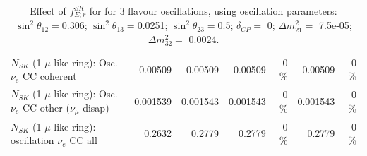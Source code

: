\begin{table}
\begin{tabular}{| l | r | r | r  r | r  r |}
                          $N_{SK}$ (1 $\mu$-like ring): Osc. $\nu_e$ CC coherent &         0.00509 &         0.00509 &         0.00509 &        0 \%  &         0.00509 &        0 \%  \\ 
           $N_{SK}$ (1 $\mu$-like ring): Osc. $\nu_e$ CC other ($\nu_\mu$ disap) &        0.001539 &        0.001543 &        0.001543 &        0 \%  &        0.001543 &        0 \%  \\ 
                        $N_{SK}$ (1 $\mu$-like ring): oscillation $\nu_e$ CC all &          0.2632 &          0.2779 &          0.2779 &        0 \%  &          0.2779 &        0 \%  \\ 
\hline
\hline
\end{tabular}
\caption{ Effect of $f_{E; r}^{SK}$   for for 3 flavour oscillations, using oscillation parameters:  $\sin^2\theta_{12} = $0.306; $\sin^2\theta_{13} = $0.0251; $\sin^2\theta_{23} = $0.5; $\delta_{CP} = $        0; $\Delta m^2_{21} = $    7.5e-05; $\Delta m^2_{32} = $    0.0024. }
\label{tab:num_sk_energy_scale_1RmuT_3f_osc_t13:0.0251_spectralreco_spectraltrue}
\end{table}
\clearpage
